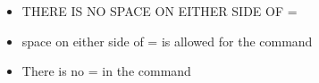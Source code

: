 \documentclass[10pt,t]{beamer}
\begin{document}
\begin{frame}
\begin{itemize}
\begin{center}
    \end{center}
    \item {} THERE IS NO SPACE ON EITHER SIDE OF =
    \item {} space on either side of = is allowed for the  command
    \item {} There is no = in the  command
  \end{itemize}
\end{frame}
\end{document}
